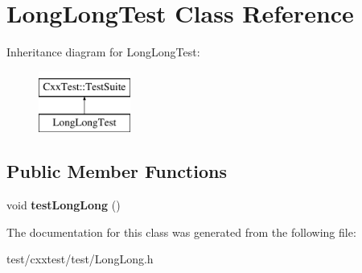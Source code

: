 \hypertarget{classLongLongTest}{\section{Long\-Long\-Test Class Reference}
\label{classLongLongTest}
}
Inheritance diagram for Long\-Long\-Test\-:\begin{figure}[H]
\begin{center}
\leavevmode
\includegraphics[height=2.000000cm]{classLongLongTest}
\end{center}
\end{figure}
\subsection*{Public Member Functions}
\begin{DoxyCompactItemize}
\item 
\hypertarget{classLongLongTest_a168612afd7939d73e94709e9c3cdeca5}{void {\bfseries test\-Long\-Long} ()}\label{classLongLongTest_a168612afd7939d73e94709e9c3cdeca5}

\end{DoxyCompactItemize}


The documentation for this class was generated from the following file\-:\begin{DoxyCompactItemize}
\item 
test/cxxtest/test/Long\-Long.\-h\end{DoxyCompactItemize}
